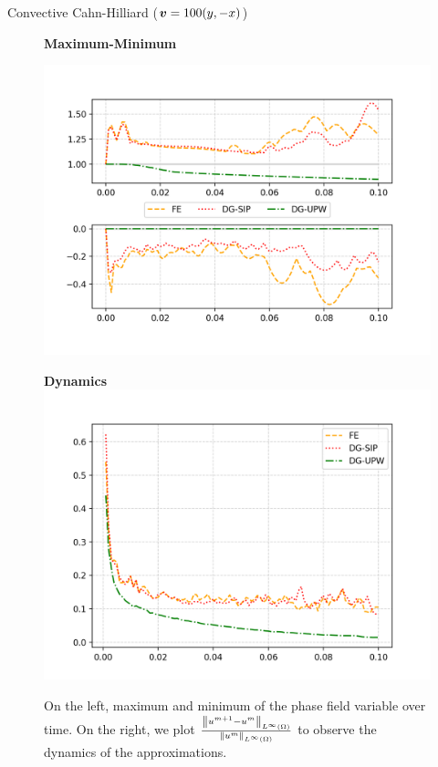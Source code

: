 \begin{frame}{Convective Cahn-Hilliard \small{($\boldsymbol{v}=100(y,-x)$)}}
	\begin{figure}[t]
		\centering
		\begin{minipage}{0.49\linewidth}
			\centering
			\textbf{Maximum-Minimum}\par\smallskip
			\includegraphics[scale=0.37]{img/convective-cahn-hilliard/max-min_adv-100.png}
		\end{minipage}
		\begin{minipage}{0.49\linewidth}
			\centering
			\textbf{Dynamics}
			\includegraphics[scale=0.37]{img/convective-cahn-hilliard/dynamics_adv-100.png}
		\end{minipage}
		\caption{On the left, maximum and minimum of the phase field variable over time. On the right, we plot $\frac{\left\|u^{m+1}-u^m\right\|_{L^\infty (\Omega)}}{\left\|u^m\right\|_{L^\infty (\Omega)}}$ to observe the dynamics of the approximations.}
	\end{figure}
\end{frame}


